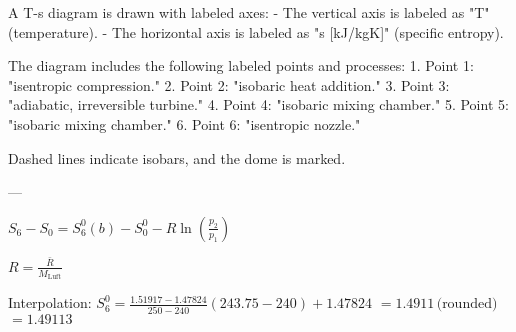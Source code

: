 A T-s diagram is drawn with labeled axes:  
- The vertical axis is labeled as "T" (temperature).  
- The horizontal axis is labeled as "s [kJ/kgK]" (specific entropy).  

The diagram includes the following labeled points and processes:  
1. Point 1: "isentropic compression."  
2. Point 2: "isobaric heat addition."  
3. Point 3: "adiabatic, irreversible turbine."  
4. Point 4: "isobaric mixing chamber."  
5. Point 5: "isobaric mixing chamber."  
6. Point 6: "isentropic nozzle."  

Dashed lines indicate isobars, and the dome is marked.  

---

\( S_6 - S_0 = S^0_6 (b) - S^0_0 - R \ln \left( \frac{p_2}{p_1} \right) \)  

\( R = \frac{\bar{R}}{M_{\text{Luft}}} \)  

Interpolation:  
\( S^0_6 = \frac{1.51917 - 1.47824}{250 - 240} (243.75 - 240) + 1.47824 \)  
\( = 1.4911 \, \text{(rounded)} \)  
\( = 1.49113 \)